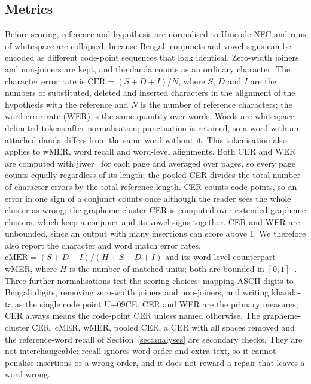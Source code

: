 \documentclass[conference]{IEEEtran}
\begin{document}
\subsection{Metrics}
Before scoring, reference and hypothesis are normalised to Unicode NFC and runs of whitespace are collapsed, because Bengali conjuncts and vowel signs can be encoded as different code-point sequences that look identical. Zero-width joiners and non-joiners are kept, and the danda counts as an ordinary character. The character error rate is $\mathrm{CER}=(S+D+I)/N$, where $S$, $D$ and $I$ are the numbers of substituted, deleted and inserted characters in the alignment of the hypothesis with the reference and $N$ is the number of reference characters; the word error rate (WER) is the same quantity over words. Words are whitespace-delimited tokens after normalisation; punctuation is retained, so a word with an attached danda differs from the same word without it. This tokenisation also applies to wMER, word recall and word-level alignments. Both CER and WER are computed with jiwer~\cite{vaessen2022jiwer} for each page and averaged over pages, so every page counts equally regardless of its length; the pooled CER divides the total number of character errors by the total reference length. CER counts code points, so an error in one sign of a conjunct counts once although the reader sees the whole cluster as wrong; the grapheme-cluster CER is computed over extended grapheme clusters, which keep a conjunct and its vowel signs together. CER and WER are unbounded, since an output with many insertions can score above 1. We therefore also report the character and word match error rates, $\mathrm{cMER}=(S+D+I)/(H+S+D+I)$ and its word-level counterpart wMER, where $H$ is the number of matched units; both are bounded in $[0,1]$~\cite{ehrmann2026hipeocrepair}. Three further normalisations test the scoring choices: mapping ASCII digits to Bengali digits, removing zero-width joiners and non-joiners, and writing khanda-ta as the single code point U+09CE. CER and WER are the primary measures; CER always means the code-point CER unless named otherwise. The grapheme-cluster CER, cMER, wMER, pooled CER, a CER with all spaces removed and the reference-word recall of Section~\ref{sec:analyses} are secondary checks. They are not interchangeable: recall ignores word order and extra text, so it cannot penalise insertions or a wrong order, and it does not reward a repair that leaves a word wrong.
\end{document}
